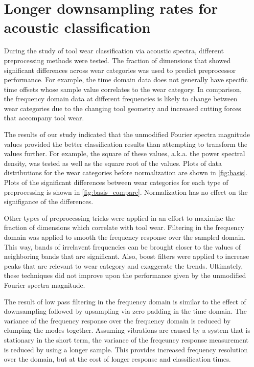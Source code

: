\chapter{Longer downsampling rates for acoustic classification
\label{chap:9}}

During the study of tool wear classification via acoustic spectra, 
different preprocessing methods were tested. 
The fraction of dimensions that showed significant differences 
across wear categories was used to predict preprocessor performance.
For example, the time domain data does not generally have specific 
time offsets whose sample value correlates to the wear category.
In comparison, the frequency domain data at different frequencies
is likely to change between wear categories due to the changing tool geometry
and increased cutting forces that accompany tool wear.

The results of our study indicated that the unmodified Fourier spectra magnitude values
provided the better classification results than attempting to transform the values further.
For example, the square of these values, a.k.a. the power spectral density, 
was tested as well as the square root of the values.
Plots of data distributions for the wear categories before normalization are shown in \ref{fig:basis}.
Plots of the significant differences between wear categories for each type of preprocessing 
is shown in \ref{fig:basis_compare}. Normalization has no effect on the signifigance of the differences.

Other types of preprocessing tricks were applied in an effort 
to maximize the fraction of dimensions which correlate with tool wear.
Filtering in the frequency domain was applied to  smooth 
the frequency response over the sampled domain.
This way, bands of irrelavent frequencies can be brought closer to the
values of neighboring bands that are significant. 
Also, boost filters were applied to increase peaks that are
relevant to wear category and exaggerate the trends.
Ultimately, these techniques did not improve upon the performance
given by the unmodified Fourier spectra magnitude.

The result of low pass filtering in the frequency domain is similar
to the effect of downsampling followed by upsampling 
via zero padding in the time domain. 
The variance of the 
frequency response over the frequency domain is reduced by clumping
the modes together.
Assuming vibrations are caused by a system that is 
stationary in the short term, the variance of the freqeuncy 
response measurement is reduced by using a longer sample.
This provides increased frequency resolution over the domain,
but at the cost of longer response and classification times.

